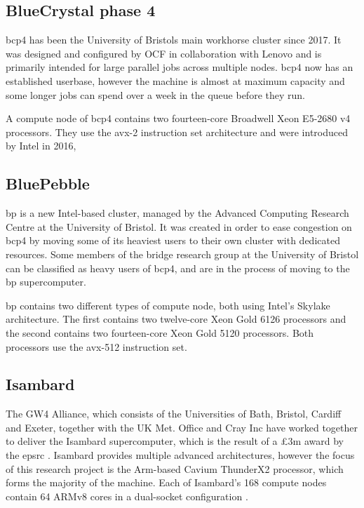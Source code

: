 \documentclass[a4paper,11pt]{report}
\begin{document}

\subsection{BlueCrystal phase 4}
\gls{bcp4} has been the University of Bristols main workhorse cluster since 2017. It was designed and configured by OCF in collaboration with Lenovo and is primarily intended for large parallel jobs across multiple nodes. \gls{bcp4} now has an established userbase, however the machine is almost at maximum capacity and some longer jobs can spend over a week in the queue before they run.
\par
A compute node of \gls{bcp4} contains two fourteen-core Broadwell Xeon E5-2680 v4 processors. They use the \gls{avx}-2 instruction set architecture and were introduced by Intel in 2016, 

\subsection{BluePebble}
\gls{bp} is a new Intel-based cluster, managed by the Advanced Computing Research Centre at the University of Bristol. It was created in order to ease congestion on \gls{bcp4} by moving some of its heaviest users to their own cluster with dedicated resources. Some members of the \gls{bridge} research group at the University of Bristol can be classified as heavy users of \gls{bcp4}, and are in the process of moving to the \gls{bp} supercomputer.
\par
\gls{bp} contains two different types of compute node, both using Intel's Skylake architecture. The first contains two twelve-core Xeon Gold 6126 processors and the second contains two fourteen-core Xeon Gold 5120 processors. Both processors use the \gls{avx}-512 instruction set. 




\subsection{Isambard}
The GW4 Alliance, which consists of the Universities of Bath, Bristol, Cardiff and Exeter, together with the UK Met. Office and Cray Inc have worked together to deliver the Isambard supercomputer, which is the result of a £3m award by the \gls{epsrc} \cite{arm2018white}. Isambard provides multiple advanced architectures, however the focus of this research project is the Arm-based Cavium ThunderX2 processor, which forms the majority of the machine. Each of Isambard's 168 compute nodes contain 64 ARMv8 cores in a dual-socket configuration \cite{thunderprocessor2018brief}. 
\end{document}

